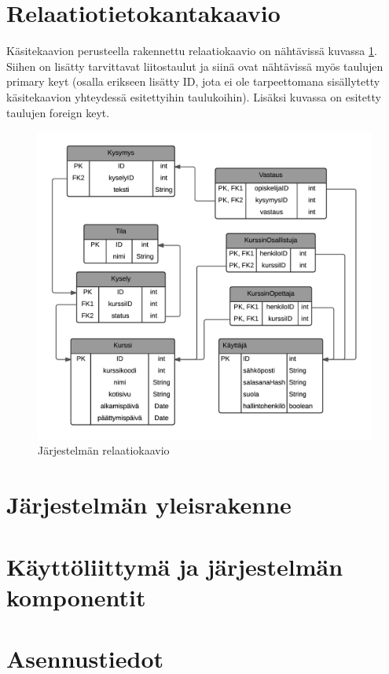 \documentclass[12pt,a4paper,titlepage]{article}
\begin{document}
\section{Relaatiotietokantakaavio}
Käsitekaavion perusteella rakennettu relaatiokaavio on nähtävissä kuvassa \ref{fig:relaatiokaavio}. Siihen on lisätty tarvittavat liitostaulut ja siinä ovat nähtävissä myös taulujen primary keyt (osalla erikseen lisätty ID, jota ei ole tarpeettomana sisällytetty käsitekaavion yhteydessä esitettyihin taulukoihin). Lisäksi kuvassa on esitetty taulujen foreign keyt.

\begin{figure}
   \centering
   \includegraphics[width=\textwidth]{kuvat/relaatiokaavio-pysty.png}
   \caption{Järjestelmän relaatiokaavio}\label{fig:relaatiokaavio}
\end{figure}

\section{Järjestelmän yleisrakenne}

\section{Käyttöliittymä ja järjestelmän komponentit}

\section{Asennustiedot}
\end{document}
